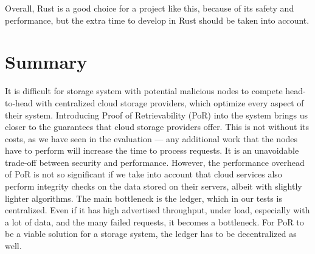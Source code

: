Overall, Rust is a good choice for a project like this, because of its safety and performance,
but the extra time to develop in Rust should be taken into account.

\section{Summary}

It is difficult for storage system with potential malicious nodes to compete
head-to-head with centralized cloud storage providers, which optimize every aspect of their system.
Introducing Proof of Retrievability (PoR) into the system brings us closer to the guarantees
that cloud storage providers offer.
This is not without its costs, as we have seen in the evaluation --- any additional work
that the nodes have to perform will increase the time to process requests.
It is an unavoidable trade-off between security and performance.
However, the performance overhead of PoR is not so significant if we take into account that
cloud services also perform integrity checks on the data stored on their servers,
albeit with slightly lighter algorithms.
The main bottleneck is the ledger, which in our tests is centralized.
Even if it has high advertised throughput, under load, especially with a lot of data,
and the many failed requests, it becomes a bottleneck.
For PoR to be a viable solution for a storage system, the ledger has to be decentralized as well.
